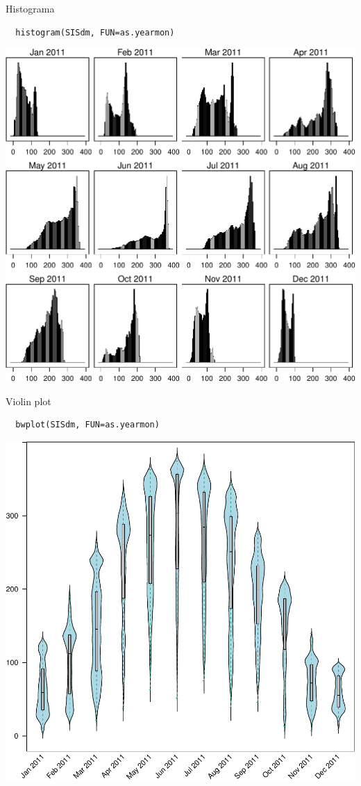 \documentclass[xcolor={usenames,svgnames,dvipsnames}]{beamer}
\begin{document}
\begin{frame}[fragile,label=sec-4-3-1]{Histograma}
 \lstset{language=R,label= ,caption= ,numbers=none}
\begin{lstlisting}
  histogram(SISdm, FUN=as.yearmon)
\end{lstlisting}

\includegraphics[width=.9\linewidth]{figs/SISdm_histogram.pdf}
\end{frame}

\begin{frame}[fragile,label=sec-4-3-2]{Violin plot}
 \lstset{language=R,label= ,caption= ,numbers=none}
\begin{lstlisting}
  bwplot(SISdm, FUN=as.yearmon)
\end{lstlisting}

\includegraphics[width=.9\linewidth]{figs/SISdm_boxplot.pdf}
\end{frame}
\end{document}
